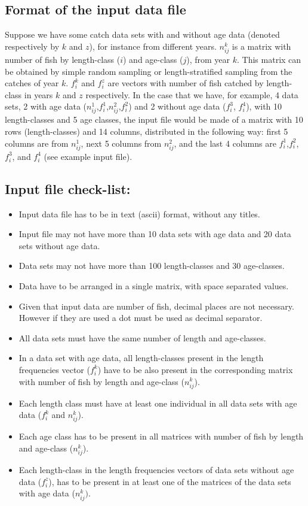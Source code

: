 \documentclass[12pt,a4paper]{article}
\begin{document}
\subsection{Format of the input data file}

Suppose we have some catch data sets with and without age data (denoted respectively by 
$k$ and $z$), for instance from different years. $n^{k}_{ij}$ is a matrix with number of fish by length-class ($i$) and age-class ($j$), from year 
$k$. This matrix can be obtained by simple random sampling or length-stratified sampling from the catches of year $k$. $f^k_{i}$ and $f^z_{i}$ are 
vectors with number of fish catched by length-class in years $k$ and $z$ respectively.
In the case that we have, for example, 4 data sets,  2 with age data ($n^1_{ij}$,$f^1_{i}$,$n^2_{ij}$,$f^2_{i}$) and 2 without age data ($f^3_{i}$, $f^4_{i}$),
with 10 length-classes and 5 age classes, the input file would be made of a matrix with 10 rows (length-classes) 
and 14 columns, distributed in the following way: first 5 columns are from $n^1_{ij}$, next 5 columns from $n^2_{ij}$, and the 
last 4 columns are $f^1_i$,$f^2_i$,$f^3_i$, and $f^4_i$ (see example input file).

\subsection{Input file check-list:}
\begin{itemize}
\item Input data file has to be in text (ascii) format, without any titles.
\item Input file may not have more than 10 data sets with age data and 20 data sets without age data.
\item Data sets may not have more than 100 length-classes and 30 age-classes.
\item Data have to be arranged in a single matrix, with space separated values.
\item Given that input data are number of fish, decimal places are not necessary. However if they are used a dot must be used as decimal separator.
\item All data sets must have the same number of length and age-classes.
\item In a data set with age data, all length-classes present in the length frequencies vector ($f^k_i$) have to be also present in the corresponding matrix with number of fish by length and age-class ($n^k_{ij}$).
\item Each length class must have at least one individual in all data sets with age data ($f^k_i$ and $n^k_{ij}$).
\item Each age class has to be present in all matrices with number of fish by length and age-class ($n^k_{ij}$).
\item Each length-class in the length frequencies vectors of data sets without age data ($f^z_i$), has to be present in at least one of the matrices of the data sets with age data ($n^k_{ij})$.
\end{itemize}
\end{document}
